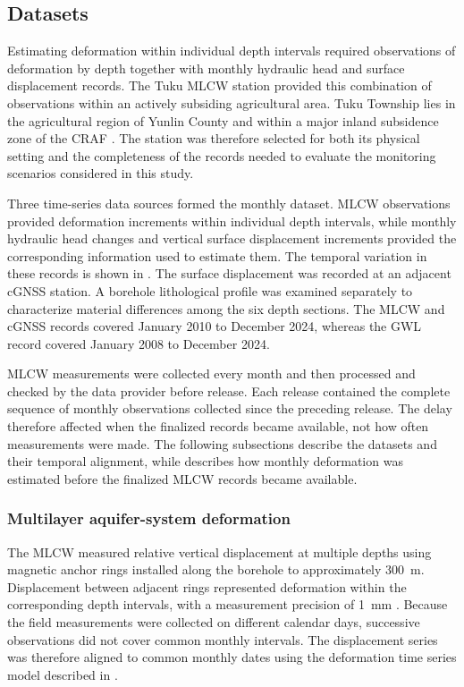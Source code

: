 \subsection{Datasets}
\label{subsec:datasets}

Estimating deformation within individual depth intervals required observations of deformation by depth together with monthly hydraulic head and surface displacement records. The Tuku MLCW station provided this combination of observations within an actively subsiding agricultural area. Tuku Township lies in the agricultural region of Yunlin County and within a major inland subsidence zone of the CRAF \citep{chang2022_wetanddry, hung_measuring_2021, hung_exploring_2024}. The station was therefore selected for both its physical setting and the completeness of the records needed to evaluate the monitoring scenarios considered in this study.

Three time-series data sources formed the monthly dataset. MLCW observations provided deformation increments within individual depth intervals, while monthly hydraulic head changes and vertical surface displacement increments provided the corresponding information used to estimate them. The temporal variation in these records is shown in . The surface displacement was recorded at an adjacent cGNSS station. A borehole lithological profile was examined separately to characterize material differences among the six depth sections. The MLCW and cGNSS records covered January 2010 to December 2024, whereas the GWL record covered January 2008 to December 2024.

MLCW measurements were collected every month and then processed and checked by the data provider before release. Each release contained the complete sequence of monthly observations collected since the preceding release. The delay therefore affected when the finalized records became available, not how often measurements were made. The following subsections describe the datasets and their temporal alignment, while  describes how monthly deformation was estimated before the finalized MLCW records became available.

\subsubsection{Multilayer aquifer-system deformation}

The MLCW measured relative vertical displacement at multiple depths using magnetic anchor rings installed along the borehole to approximately 300~m. Displacement between adjacent rings represented deformation within the corresponding depth intervals, with a measurement precision of 1~mm \citep{hung_measuring_2021}. Because the field measurements were collected on different calendar days, successive observations did not cover common monthly intervals. The displacement series was therefore aligned to common monthly dates using the deformation time series model described in .

